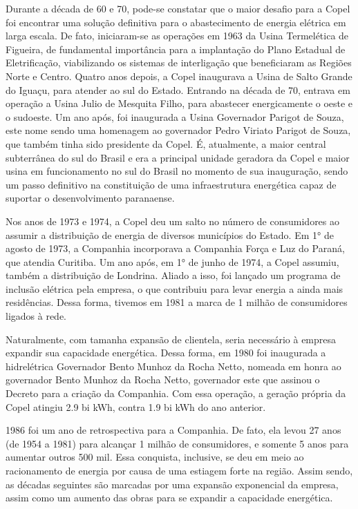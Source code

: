 \documentclass[aprovado,numbers]{coppe}
\begin{document}
  Durante a década de 60 e 70, pode-se constatar que o maior desafio para a Copel foi encontrar uma solução definitiva para o abastecimento de energia elétrica em larga escala. De fato, iniciaram-se as operações em 1963 da Usina Termelética de Figueira, de fundamental importância para a implantação do Plano Estadual de Eletrificação, viabilizando os sistemas de interligação que beneficiaram as Regiões Norte e Centro. Quatro anos depois, a Copel inaugurava a Usina de Salto Grande do Iguaçu, para atender ao sul do Estado. Entrando na década de 70, entrava em operação a Usina Julio de Mesquita Filho, para abastecer energicamente o oeste e o sudoeste. Um ano após, foi inaugurada a Usina Governador Parigot de Souza, este nome sendo uma homenagem ao governador Pedro Viriato Parigot de Souza, que também tinha sido presidente da Copel. É, atualmente, a maior central subterrânea do sul do Brasil e era a principal unidade geradora da Copel e maior usina em funcionamento no sul do Brasil no momento de sua inauguração, sendo um passo definitivo na constituição de uma infraestrutura energética capaz de suportar o desenvolvimento paranaense.

  Nos anos de 1973 e 1974, a Copel deu um salto no número de consumidores ao assumir a distribuição de energia de diversos municípios do Estado. Em 1° de agosto de 1973, a Companhia incorporava a Companhia Força e Luz do Paraná, que atendia Curitiba. Um ano após, em 1° de junho de 1974, a Copel assumiu, também a distribuição de Londrina. Aliado a isso, foi lançado um programa de inclusão elétrica pela empresa, o que contribuiu para levar energia a ainda mais residências. Dessa forma, tivemos em 1981 a marca de 1 milhão de consumidores ligados à rede.

  Naturalmente, com tamanha expansão de clientela, seria necessário à empresa expandir sua capacidade energética. Dessa forma, em 1980 foi inaugurada a hidrelétrica Governador Bento Munhoz da Rocha Netto, nomeada em honra ao governador Bento Munhoz da Rocha Netto, governador este que assinou o Decreto para a criação da Companhia. Com essa operação, a geração própria da Copel atingiu 2.9 bi kWh, contra 1.9 bi kWh do ano anterior.

  1986 foi um ano de retrospectiva para a Companhia. De fato, ela levou 27 anos (de 1954 a 1981) para alcançar 1 milhão de consumidores, e somente 5 anos para aumentar outros 500 mil. Essa conquista, inclusive, se deu em meio ao racionamento de energia por causa de uma estiagem forte na região. Assim sendo, as décadas seguintes são marcadas por uma expansão exponencial da empresa, assim como um aumento das obras para se expandir a capacidade energética.
\end{document}
